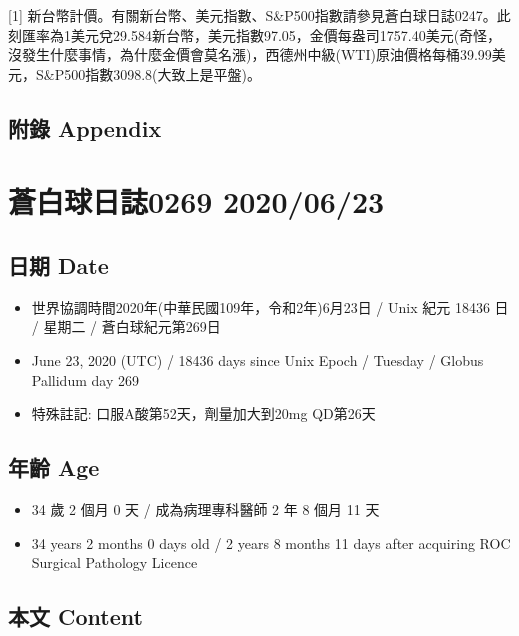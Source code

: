 \documentclass[a5paper, 11pt
]{book}
\providecommand{\tightlist}{%
  \setlength{\itemsep}{0pt}\setlength{\parskip}{0pt}}
\begin{document}
{[}1{]}
新台幣計價。有關新台幣、美元指數、S\&P500指數請參見蒼白球日誌0247。此刻匯率為1美元兌29.584新台幣，美元指數97.05，金價每盎司1757.40美元(奇怪，沒發生什麼事情，為什麼金價會莫名漲)，西德州中級(WTI)原油價格每桶39.99美元，S\&P500指數3098.8(大致上是平盤)。

\hypertarget{ux9644ux9304-appendix-21}{%
\subsection{附錄 Appendix}\label{ux9644ux9304-appendix-21}}

\hypertarget{ux84bcux767dux7403ux65e5ux8a8c0269-20200623}{%
\section{蒼白球日誌0269
2020/06/23}\label{ux84bcux767dux7403ux65e5ux8a8c0269-20200623}}

\hypertarget{ux65e5ux671f-date-22}{%
\subsection{日期 Date}\label{ux65e5ux671f-date-22}}

\begin{itemize}
\tightlist
\item
  世界協調時間2020年(中華民國109年，令和2年)6月23日 / Unix 紀元 18436 日
  / 星期二 / 蒼白球紀元第269日
\item
  June 23, 2020 (UTC) / 18436 days since Unix Epoch / Tuesday / Globus
  Pallidum day 269
\item
  特殊註記: 口服A酸第52天，劑量加大到20mg QD第26天
\end{itemize}

\hypertarget{ux5e74ux9f61-age-22}{%
\subsection{年齡 Age}\label{ux5e74ux9f61-age-22}}

\begin{itemize}
\tightlist
\item
  34 歲 2 個月 0 天 / 成為病理專科醫師 2 年 8 個月 11 天
\item
  34 years 2 months 0 days old / 2 years 8 months 11 days after
  acquiring ROC Surgical Pathology Licence
\end{itemize}

\hypertarget{ux672cux6587-content-22}{%
\subsection{本文 Content}\label{ux672cux6587-content-22}}
\end{document}
